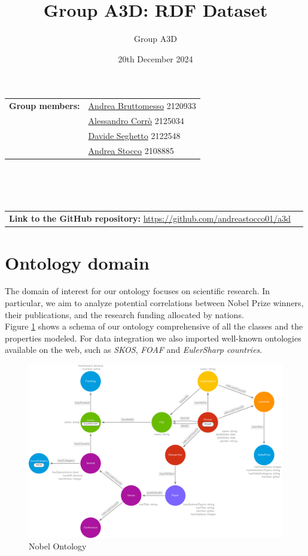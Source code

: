 \documentclass{article}
\title{Group A3D: RDF Dataset}
\author{Group A3D}
\date{20th December 2024}
\begin{document}
\maketitle

\noindent\begin{tabular}{@{}ll}
	\textbf{Group members:}
	 & \href{mailto:andrea.bruttomesso.1@studenti.unipd.it}{Andrea Bruttomesso} 2120933 \\
	 & \href{mailto:alessandro.corro.1@studenti.unipd.it}{Alessandro Corr\`o} 2125034   \\
	 & \href{mailto:davide.seghetto@studenti.unipd.it}{Davide Seghetto} 2122548         \\
	 & \href{mailto:andrea.stocco.8@studenti.unipd.it}{Andrea Stocco} 2108885           \\
\end{tabular}
\\\\\\
\noindent\begin{tabular}{@{}ll}
	\textbf{Link to the GitHub repository:} \href{https://github.com/andreastocco01/a3d}{https://github.com/andreastocco01/a3d}
\end{tabular}

\section*{Ontology domain}
The domain of interest for our ontology focuses on scientific research. In particular, we aim to analyze potential correlations between Nobel Prize winners,
their publications, and the research funding allocated by nations. \\
Figure \ref{fig:nobelOntology} shows a schema of our ontology comprehensive of all the classes
and the properties modeled. For data integration we also imported well-known ontologies available on the web, such as \textit{SKOS}, \textit{FOAF} and \textit{EulerSharp countries}.

\begin{figure}[ht]
	\centering
	\includegraphics[width=\textwidth]{../nobelOntologyTransparent.png}
	\caption{Nobel Ontology}
	\label{fig:nobelOntology}
\end{figure}
\end{document}
